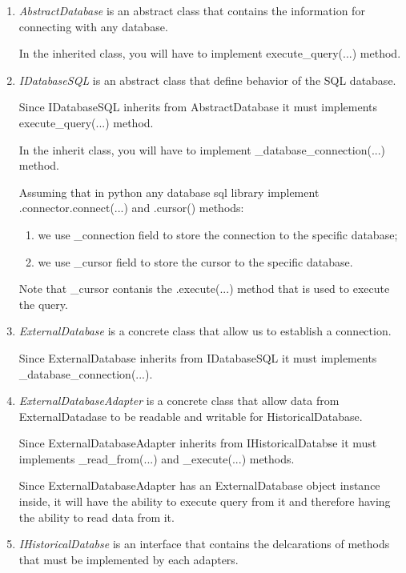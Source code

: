 \begin{enumerate}
	\item \textit{AbstractDatabase} is an abstract class that contains the information for connecting with any database.
     
     In the inherited class, you will have to implement execute\_query(...) method.

	\item \textit{IDatabaseSQL} is an abstract class that define behavior of the SQL database.
     
     Since IDatabaseSQL inherits from AbstractDatabase it must implements execute\_query(...) method.
     
     In the inherit class, you will have to implement \_database\_connection(...) method.

     Assuming that in python any database sql library implement .connector.connect(...) and .cursor() methods: 
\begin{enumerate}
	\item we use \_connection field to store the connection to the specific database;
	\item we use \_cursor field to store the cursor to the specific database.
\end{enumerate}

Note that \_cursor contanis the .execute(...) method that is used to execute the query.

	\item \textit{ExternalDatabase} is a concrete class that allow us to establish a connection.
	
     Since ExternalDatabase inherits from IDatabaseSQL it must implements \_database\_connection(...).

	\item \textit{ExternalDatabaseAdapter} is a concrete class that allow data from ExternalDatadase to be readable and writable for HistoricalDatabase. 
	
     Since ExternalDatabaseAdapter inherits from IHistoricalDatabse it must implements \_read\_from(...) and \_execute(...) methods.
     
     Since ExternalDatabaseAdapter has an ExternalDatabase object instance inside, it will have the ability to execute query from it and therefore having the ability to read data from it.

	\item \textit{IHistoricalDatabse} is an interface that contains the delcarations of methods that must be implemented by each adapters.
	

\end{enumerate}
